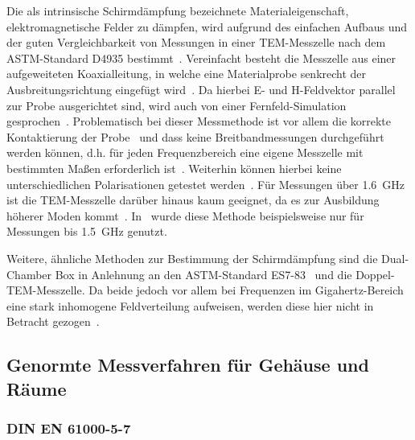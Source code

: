 Die als intrinsische Schirmdämpfung bezeichnete Materialeigenschaft, elektromagnetische Felder zu dämpfen, wird aufgrund des einfachen Aufbaus und der guten Vergleichbarkeit von Messungen in einer TEM-Messzelle nach dem ASTM-Standard D4935 bestimmt~\cite{ASTM_D4935, Measurement_Shielding_Textile_Materials_Free_Space_Transmission}. Vereinfacht besteht die Messzelle aus einer aufgeweiteten Koaxialleitung, in welche eine Materialprobe senkrecht der Ausbreitungsrichtung eingefügt wird~\cite{EM_Schirmung, Handbook_EMI_Vol_3}. Da hierbei E- und H-Feldvektor parallel zur Probe ausgerichtet sind, wird auch von einer Fernfeld-Simulation gesprochen~\cite{Techniques_Shielding_Effectiveness_Far_Field_Simulation, EMV}. Problematisch bei dieser Messmethode ist vor allem die korrekte Kontaktierung der Probe~\cite{EM_Schirmung} und dass keine Breitbandmessungen durchgeführt werden können, d.h. für jeden Frequenzbereich eine eigene Messzelle mit bestimmten Maßen erforderlich ist~\cite{Techniques_Shielding_Effectiveness_Far_Field_Simulation, EMV}. Weiterhin können hierbei keine unterschiedlichen Polarisationen getestet werden~\cite{Techniques_Shielding_Effectiveness_Far_Field_Simulation}. Für Messungen über \SI{1,6}{\giga\hertz} ist die TEM-Messzelle darüber hinaus kaum geeignet, da es zur Ausbildung höherer Moden kommt~\cite{EMV}. In~\cite{Measurement_Electromagnetic_Shielding_Effectiveness_Composite_Carbon_Nickel_Thinfilm} wurde diese Methode beispielsweise nur für Messungen bis \SI{1,5}{\giga\hertz} genutzt.
\par
\vspace{\linespace}
Weitere, ähnliche Methoden zur Bestimmung der Schirmdämpfung sind die Dual-Chamber Box in Anlehnung an den ASTM-Standard ES7-83~\cite{ASTM_ES7-83} und die Doppel-TEM-Messzelle. Da beide jedoch vor allem bei Frequenzen im Gigahertz-Bereich eine stark inhomogene Feldverteilung aufweisen, werden diese hier nicht in Betracht gezogen~\cite{EM_Schirmung, EMV}.


\subsection{Genormte Messverfahren für Gehäuse und Räume}\label{cha:2_sub_Genormte_Messverfahren}

\subsubsection{DIN EN 61000-5-7}

